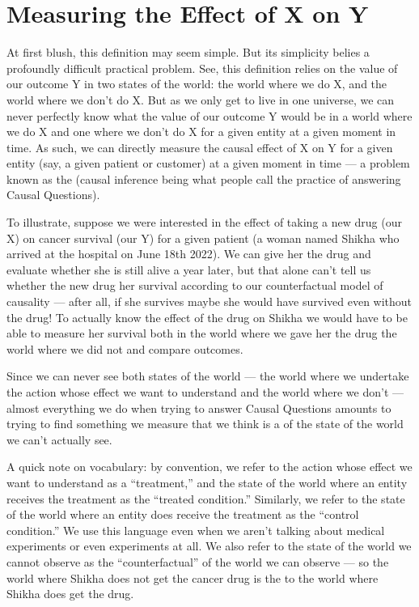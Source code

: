 \documentclass[letterpaper,10pt,english]{jupyterBook}
\begin{document}
\section{Measuring the Effect of X on Y}
\label{\detokenize{30_questions/30_causal_questions_theory:measuring-the-effect-of-x-on-y}}
\sphinxAtStartPar
At first blush, this definition may seem simple. But its simplicity belies a profoundly difficult practical problem. See, this definition relies on  the value of our outcome Y in two states of the world: the world where we do X, and the world where we don’t do X. But as we only get to live in one universe, we can never perfectly know what the value of our outcome Y would be in  a world where we do X and one where we don’t do X for a given entity at a given moment in time. As such, we can  directly measure the causal effect of X on Y for a given entity (say, a given patient or customer) at a given moment in time — a problem known as the  (causal inference being what people call the practice of answering Causal Questions).

\sphinxAtStartPar
To illustrate, suppose we were interested in the effect of taking a new drug (our X) on cancer survival (our Y)  for a given patient (a woman named Shikha who arrived at the hospital on June 18th 2022). We can give her the drug and evaluate whether she is still alive a year later, but that alone can’t tell us whether the new drug  her survival according to our counterfactual model of causality — after all, if she survives maybe she would have survived even without the drug! To actually know the effect of the drug on Shikha  we would have to be able to measure her survival both in the world where we gave her the drug  the world where we did not and compare outcomes.

\sphinxAtStartPar
Since we can never see both states of the world — the world where we undertake the action whose effect we want to understand and the world where we don’t — almost everything we do when trying to answer Causal Questions amounts to trying to find something we  measure that we think is a  of the state of the world we can’t actually see.

\sphinxAtStartPar
A quick note on vocabulary: by convention, we refer to the action whose effect we want to understand as a “treatment,” and the state of the world where an entity receives the treatment as the “treated condition.” Similarly, we refer to the state of the world where an entity does  receive the treatment as the “control condition.” We use this language even when we aren’t talking about medical experiments or even experiments at all. We also refer to the state of the world we cannot observe as the “counterfactual” of the world we can observe — so the world where Shikha does not get the cancer drug is the  to the world where Shikha does get the drug.
\end{document}
